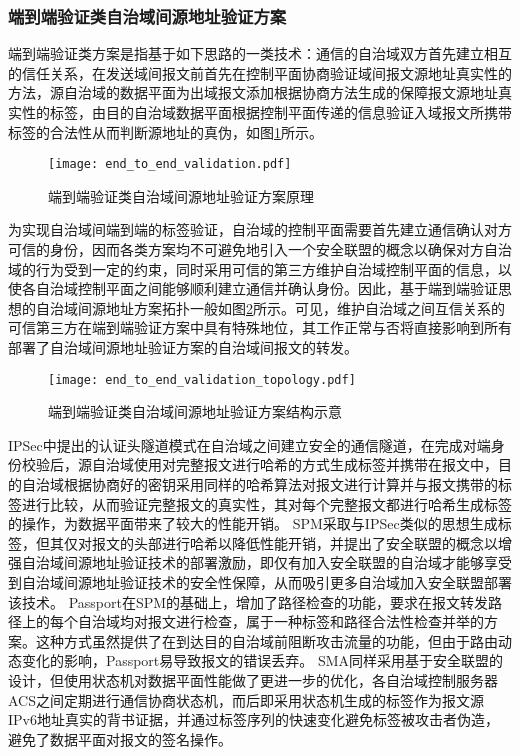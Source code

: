       \subsubsection{端到端验证类自治域间源地址验证方案}
      \label{survey:sava:interas:tag}
      端到端验证类方案是指基于如下思路的一类技术：通信的自治域双方首先建立相互的信任关系，在发送域间报文前首先在控制平面协商验证域间报文源地址真实性的方法，源自治域的数据平面为出域报文添加根据协商方法生成的保障报文源地址真实性的标签，由目的自治域数据平面根据控制平面传递的信息验证入域报文所携带标签的合法性从而判断源地址的真伪，如图\ref{fig:end_to_end_validation}所示。

      \begin{figure}[ht]
        \centering
        \texttt{[image: end\_to\_end\_validation.pdf]}
        \caption{端到端验证类自治域间源地址验证方案原理}
        \label{fig:end_to_end_validation}
      \end{figure}

      为实现自治域间端到端的标签验证，自治域的控制平面需要首先建立通信确认对方可信的身份，因而各类方案均不可避免地引入一个安全联盟的概念以确保对方自治域的行为受到一定的约束，同时采用可信的第三方维护自治域控制平面的信息，以使各自治域控制平面之间能够顺利建立通信并确认身份。因此，基于端到端验证思想的自治域间源地址方案拓扑一般如图\ref{fig:end_to_end_validation_topology}所示。可见，维护自治域之间互信关系的可信第三方在端到端验证方案中具有特殊地位，其工作正常与否将直接影响到所有部署了自治域间源地址验证方案的自治域间报文的转发。

      \begin{figure}[ht]
        \centering
        \texttt{[image: end\_to\_end\_validation\_topology.pdf]}
        \caption{端到端验证类自治域间源地址验证方案结构示意}
        \label{fig:end_to_end_validation_topology}
      \end{figure}

      IPSec\cite{RFC2401}中提出的认证头隧道模式在自治域之间建立安全的通信隧道，在完成对端身份校验后，源自治域使用对完整报文进行哈希的方式生成标签并携带在报文中，目的自治域根据协商好的密钥采用同样的哈希算法对报文进行计算并与报文携带的标签进行比较，从而验证完整报文的真实性，其对每个完整报文都进行哈希生成标签的操作，为数据平面带来了较大的性能开销。
      SPM\cite{bremler2005spoofing}采取与IPSec类似的思想生成标签，但其仅对报文的头部进行哈希以降低性能开销，并提出了安全联盟的概念以增强自治域间源地址验证技术的部署激励，即仅有加入安全联盟的自治域才能够享受到自治域间源地址验证技术的安全性保障，从而吸引更多自治域加入安全联盟部署该技术。
      Passport\cite{liu2006efficient}在SPM的基础上，增加了路径检查的功能，要求在报文转发路径上的每个自治域均对报文进行检查，属于一种标签和路径合法性检查并举的方案。这种方式虽然提供了在到达目的自治域前阻断攻击流量的功能，但由于路由动态变化的影响，Passport易导致报文的错误丢弃。
      SMA\cite{shen2008two,bi2009preventing}同样采用基于安全联盟的设计，但使用状态机对数据平面性能做了更进一步的优化，各自治域控制服务器ACS之间定期进行通信协商状态机，而后即采用状态机生成的标签作为报文源IPv6地址真实的背书证据，并通过标签序列的快速变化避免标签被攻击者伪造，避免了数据平面对报文的签名操作。

